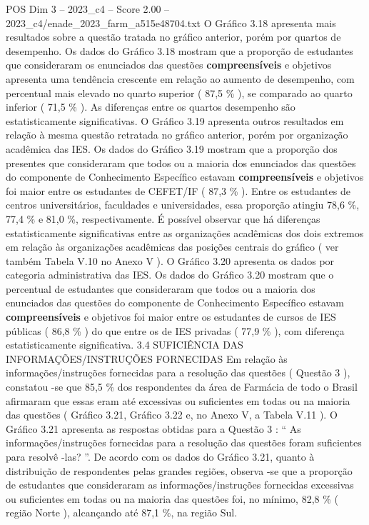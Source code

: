 \begin{textsample}{POS Dim 3 – 2023\_c4 – Score 2.00 – 2023\_c4/enade\_2023\_farm\_a515e48704.txt}
O Gráfico 3.18 apresenta mais resultados sobre a questão tratada no gráfico anterior, porém por quartos de desempenho.
Os dados do Gráfico 3.18 mostram que a proporção de estudantes que consideraram os enunciados das questões \textbf{compreensíveis} e objetivos apresenta uma tendência crescente em relação ao aumento de desempenho, com percentual mais elevado no quarto superior ( 87,5 \% ), se comparado ao quarto inferior ( 71,5 \% ).
As diferenças entre os quartos desempenho são estatisticamente significativas.
O Gráfico 3.19 apresenta outros resultados em relação à mesma questão retratada no gráfico anterior, porém por organização acadêmica das IES.
Os dados do Gráfico 3.19 mostram que a proporção dos presentes que consideraram que todos ou a maioria dos enunciados das questões do componente de Conhecimento Específico estavam \textbf{compreensíveis} e objetivos foi maior entre os estudantes de CEFET/IF ( 87,3 \% ).
Entre os estudantes de centros universitários, faculdades e universidades, essa proporção atingiu 78,6 \%, 77,4 \% e 81,0 \%, respectivamente.
É possível observar que há diferenças estatisticamente significativas entre as organizações acadêmicas dos dois extremos em relação às organizações acadêmicas das posições centrais do gráfico ( ver também Tabela V.10 no Anexo V ).
O Gráfico 3.20 apresenta os dados por categoria administrativa das IES.
Os dados do Gráfico 3.20 mostram que o percentual de estudantes que consideraram que todos ou a maioria dos enunciados das questões do componente de Conhecimento Específico estavam \textbf{compreensíveis} e objetivos foi maior entre os estudantes de cursos de IES públicas ( 86,8 \% ) do que entre os de IES privadas ( 77,9 \% ), com diferença estatisticamente significativa. 3.4 SUFICIÊNCIA DAS INFORMAÇÕES/INSTRUÇÕES FORNECIDAS Em relação às informações/instruções fornecidas para a resolução das questões ( Questão 3 ), constatou -se que 85,5 \% dos respondentes da área de Farmácia de todo o Brasil afirmaram que essas eram até excessivas ou suficientes em todas ou na maioria das questões ( Gráfico 3.21, Gráfico 3.22 e, no Anexo V, a Tabela V.11 ).
O Gráfico 3.21 apresenta as respostas obtidas para a Questão 3 : “ As informações/instruções fornecidas para a resolução das questões foram suficientes para resolvê -las? ”.
De acordo com os dados do Gráfico 3.21, quanto à distribuição de respondentes pelas grandes regiões, observa -se que a proporção de estudantes que consideraram as informações/instruções fornecidas excessivas ou suficientes em todas ou na maioria das questões foi, no mínimo, 82,8 \% ( região Norte ), alcançando até 87,1 \%, na região Sul.

\end{textsample}

